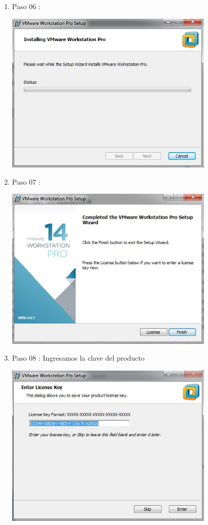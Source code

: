 \begin{enumerate}[1.]
	\item Paso 06 :

	\begin{center}
	\includegraphics[width=10cm]{./Imagenes/WM06} 
	\end{center}

	\hfill \break
	\hfill \break
	\hfill \break
	\hfill \break
	\hfill \break
	\hfill \break
	\hfill \break
	\hfill \break
	\item Paso 07 :

	\begin{center}
	\includegraphics[width=10cm]{./Imagenes/WM07} 
	\end{center}

	\item Paso 08 : Ingresamos la clave del producto

	\begin{center}
	\includegraphics[width=10cm]{./Imagenes/WM08} 
	\end{center}


\end{enumerate}
